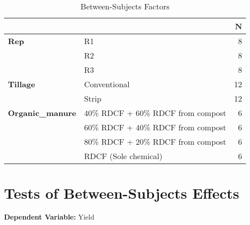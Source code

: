 \documentclass[oneside,12pt,fleqn]{book}
\begin{document}
\begin{table}[ht]
\centering
\begin{tabular}{llr}
\toprule
\textbf{}        & \textbf{}                                     & \textbf{N} \\ \midrule
\textbf{Rep}     & R1                                            & 8          \\
                 & R2                                            & 8          \\
                 & R3                                            & 8          \\ \midrule
\textbf{Tillage} & Conventional                                  & 12         \\
                 & Strip                                         & 12         \\ \midrule
\textbf{Organic\_manure} & 40\% RDCF + 60\% RDCF from compost         & 6          \\
                 & 60\% RDCF + 40\% RDCF from compost            & 6          \\
                 & 80\% RDCF + 20\% RDCF from compost            & 6          \\
                 & RDCF (Sole chemical)                          & 6          \\ \bottomrule
\end{tabular}
\caption{Between-Subjects Factors}
\end{table}






\section*{Tests of Between-Subjects Effects}

\noindent \textbf{Dependent Variable:} Yield
\end{document}
